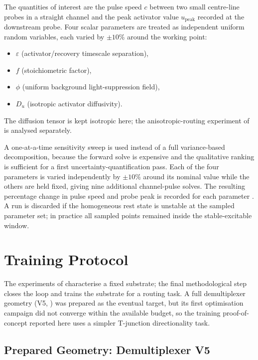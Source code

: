 The quantities of interest are the pulse speed $c$ between two small centre-line probes in a straight channel and the peak activator value $u_{\mathrm{peak}}$ recorded at the downstream probe.
Four scalar parameters are treated as independent uniform random variables, each varied by $\pm 10\%$ around the working point:
\begin{itemize}
    \item $\varepsilon$ (activator/recovery timescale separation),
    \item $f$ (stoichiometric factor),
    \item $\phi$ (uniform background light-suppression field),
    \item $D_{u}$ (isotropic activator diffusivity).
\end{itemize}
The diffusion tensor is kept isotropic here; the anisotropic-routing experiment of  is analysed separately.

A one-at-a-time sensitivity sweep is used instead of a full variance-based decomposition, because the forward solve is expensive and the qualitative ranking is sufficient for a first uncertainty-quantification pass.
Each of the four parameters is varied independently by $\pm 10\%$ around its nominal value while the others are held fixed, giving nine additional channel-pulse solves.
The resulting percentage change in pulse speed and probe peak is recorded for each parameter \cite{abbaszadeh2019uncertainty}.
A run is discarded if the homogeneous rest state is unstable at the sampled parameter set; in practice all sampled points remained inside the stable-excitable window.

\section{Training Protocol}
\label{sec:meth_demux}

The experiments of  characterise a fixed substrate; the final methodological step closes the loop and trains the substrate for a routing task.
A full demultiplexer geometry (V5, ) was prepared as the eventual target, but its first optimisation campaign did not converge within the available budget, so the training proof-of-concept reported here uses a simpler T-junction directionality task.

\subsection{Prepared Geometry: Demultiplexer V5}
\label{sec:meth_demux_geometry}

